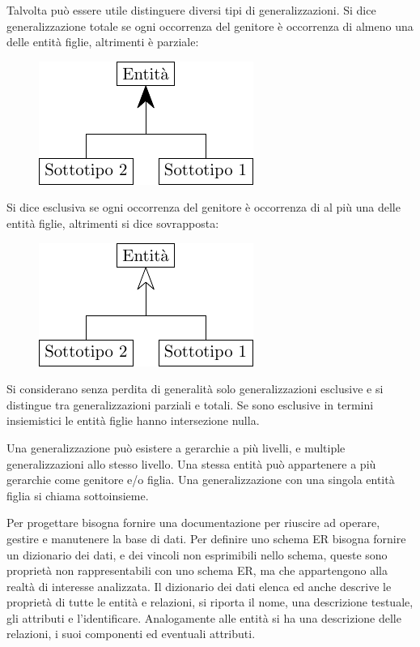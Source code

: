 \documentclass{article}
\numberwithin{equation}{subsection}
\begin{document}
Talvolta può essere utile distinguere diversi tipi di generalizzazioni. Si dice generalizzazione totale se ogni occorrenza del genitore è occorrenza di almeno 
una delle entità figlie, altrimenti è parziale:
\begin{figure}[H]%
    \centering%
    \includegraphics[scale=1.25]{generalizzazione_totale.pdf}%
\end{figure}
Si dice esclusiva se ogni occorrenza del genitore è occorrenza di al più una delle entità figlie, 
altrimenti si dice sovrapposta:
\begin{figure}[H]%
    \centering%
    \includegraphics[scale=1.25]{generalizzazione_esclusiva.pdf}%
\end{figure}
Si considerano senza perdita di generalità solo generalizzazioni esclusive e si distingue tra generalizzazioni parziali e totali. 
Se sono esclusive in termini insiemistici le entità figlie hanno intersezione nulla. 

Una generalizzazione può esistere a gerarchie a più livelli, e multiple generalizzazioni allo stesso livello. Una stessa entità può appartenere a più gerarchie come genitore e/o figlia. Una generalizzazione con una singola entità 
figlia si chiama sottoinsieme. 

Per progettare bisogna fornire una documentazione per riuscire ad operare, gestire e manutenere la base di dati. 
Per definire uno schema ER bisogna fornire un dizionario dei dati, e dei vincoli non esprimibili nello schema, queste sono proprietà non rappresentabili con uno 
schema ER, ma che appartengono alla realtà di interesse analizzata. 
Il dizionario dei dati elenca ed anche descrive le proprietà di tutte le entità e relazioni, si riporta il nome, una descrizione testuale, gli attributi e 
l'identificare. 
Analogamente alle entità si ha una descrizione delle relazioni, i suoi componenti ed eventuali attributi.
\end{document}
